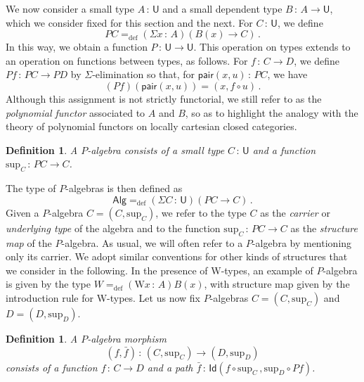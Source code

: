 \documentclass[10pt,a4paper,oneside,reqno]{amsart}
\theoremstyle{mythm}
\theoremstyle{mydef}
\newtheorem{definition}[theorem]{Definition}
\theoremstyle{myrmk}
\newcommand{\defeq}{=_{\mathrm{def}}}
\newcommand{\co}{\,{:}\,}
\newcommand{\Id}{\mathsf{Id}}
\newcommand{\pair}{\mathsf{pair}}
\newcommand{\W}{\mathrm{W}}
\newcommand{\U}{\mathsf{U}}
\newcommand{\Palg}{\mathsf{Alg}}
\renewcommand{\sup}{\mathrm{sup}}
\begin{document}
We now consider a small type $A \co \U$ and a small dependent type $B \co A \to \U$, which we consider
fixed for this section and the next. For $C \co \U$,
we define
\[
PC \defeq (\Sigma x \co A) (B(x) \to C) \, .
\]
In this way, we obtain a function $P \co \U \to \U$. This operation on types extends to an operation on functions between 
 types, as follows. For $f \co C \to D$, we define $P f  \co PC \to PD$ by $\Sigma$-elimination
so that, for $\pair(x, u) \co PC$, we have 
\[
(Pf )( \pair(x, u)) = (x,f\circ u) \, .
\] 
Although this assignment is not strictly functorial, we still refer to  as the \emph{polynomial functor} associated to $A$ and $B$, so as to highlight the analogy with the theory of polynomial functors on locally cartesian closed categories.

\begin{definition} A \emph{$P$-algebra} consists of a small type $C \co \U$ and a function $\sup_C \co PC \to C$. 
\end{definition}

\smallskip

 The type of $P$-algebras is then defined as 
 \[
 \Palg  \defeq (\Sigma C \co \U) (PC \to C) \, .
 \]
 Given a $P$-algebra $C = (C, \sup_C)$,
 we refer to the type $C$ as the \emph{carrier} or \emph{underlying type} of the algebra and to the function $\sup_C \co PC\to C$ as the \emph{structure map} of the $P$-algebra. 
 As usual,  we will often refer to a 
 $P$-algebra by mentioning only its carrier. We adopt similar conventions for other kinds of structures that we consider
 in the following.  In the
 presence of W-types, an example of $P$-algebra is given by the type $W \defeq (\W x\co A)B(x)$, with structure map given by the introduction rule for W-types. 
Let us now fix $P$-algebras $C = (C, \sup_C)$ and $D = (D, \sup_D)$. 

\begin{definition} A \emph{$P$-algebra morphism}
\[
(f, \bar{f}) \co (C, \sup_C) \rightarrow (D, \sup_D)
\]
consists of a function $f \co C \rightarrow D$ and a path $\bar{f} \co \Id( f \circ \sup_C \, ,  \sup_{D} \circ P f )$.
\end{definition}
\end{document}
